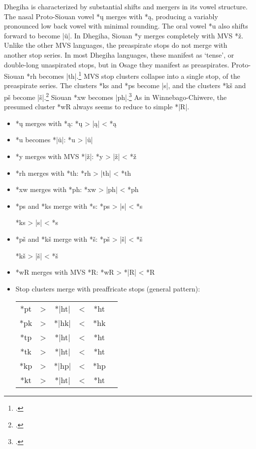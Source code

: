 \documentclass[output=paper]{LSP/langsci}
\begin{document}
Dhegiha is characterized by substantial shifts and mergers in its vowel structure.  The nasal Proto-Siouan vowel *\k{u} merges with *\k{a}, producing a variably pronounced low back vowel with minimal rounding.  The oral vowel *u also shifts forward to become |\"u|.  In Dhegiha, Siouan *y merges completely with MVS *\v{z}.  Unlike the other MVS languages, the preaspirate stops do not merge with another stop series.  In most Dhegiha languages, these manifest as `tense', or double-long unaspirated stops, but in Osage they manifest as preaspirates.  Proto-Siouan *rh becomes |th|.\footnote{\citealt[165]{CSD2006}.} MVS stop clusters collapse into a single stop, of the preaspirate series.  The clusters *ks and *ps become |s|, and the clusters *kš and pš become |š|.\footnote{\citealt[64, 123, 222, 849]{CSD2006}.} Siouan *xw becomes |ph|.\footnote{\citealt[180]{CSD2006}.} As in Winnebago-Chiwere, the presumed cluster *wR always seems to reduce to simple *|R|.

\begin{itemize}
\item *\k{u} merges with *\k{a}: \hspace{3.1em} *\k{u}	>	|\k{a}|	<	*\k{a}
\item *u becomes *|\"u|:	 \hspace{4.1em} *u	>	|\"u|
\item *y merges with MVS *|\v{z}|: \hspace{1em} *y	>	|\v{z}|	<	*\v{z}
\item *rh merges with *th: \hspace{3em} *rh	>	|th|	<	*th
\item *xw merges with *ph:	\hspace{ 3em} *xw	>	|ph|	<	*ph
\item *ps and *ks merge with *s: \hspace{1em} *ps	>	|s|	<	*s

\hspace{12em} *ks	>	|s|	<	*s
\item *pš and *kš merge with *š: \hspace{1em} *pš	>	|š|	<	*š

\hspace{12em} *kš	>	|š|	<	*š
\item *wR merges with MVS *R: \hspace{1em} *wR	>	*|R|	<	*R
\item Stop clusters merge with preaffricate stops (general pattern):	


\begin{tabular}[t]{c c c c c c }
*pt & > & *|ht| & < & *ht \\
*pk	& > & *|hk| & < & *hk \\
*tp & > & *|ht| & < & *ht \\
*tk & > & *|ht| & < & *ht \\
*kp	& >	 & *|hp|	& <	& *hp \\
*kt	& >	& *|ht| & < & *ht \\
\end{tabular}
\end{itemize} 
 
\end{document}
